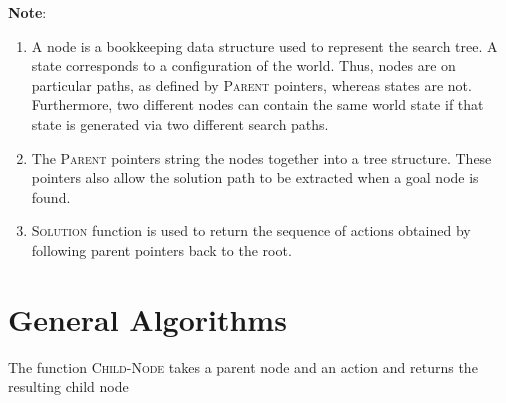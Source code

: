 \textbf{Note}:
\begin{enumerate}
    \item A node is a bookkeeping data structure used to represent the search tree. 
    A state corresponds to a configuration of the world. 
    Thus, nodes are on particular paths, as defined by \textsc{Parent} pointers, whereas states are not. 
    Furthermore, two different nodes can contain the same world state if that state is generated via two different search paths.
    \hfill \cite{ai/book/Artificial-Intelligence-A-Modern-Approach/Russell-Norvig}

    \item The \textsc{Parent} pointers string the nodes together into a tree structure. These pointers also allow the solution path to be extracted when a goal node is found.
    \hfill \cite{ai/book/Artificial-Intelligence-A-Modern-Approach/Russell-Norvig}

    \item \textsc{Solution} function is used to return the sequence of actions obtained by following parent pointers back to the root.
    \hfill \cite{ai/book/Artificial-Intelligence-A-Modern-Approach/Russell-Norvig}
\end{enumerate}










\section{General Algorithms}


\begin{algorithm}[H]
    \caption{The function \textsc{Child-Node} takes a parent node and an action and returns the resulting child node \cite{ai/book/Artificial-Intelligence-A-Modern-Approach/Russell-Norvig}}

\end{algorithm}

